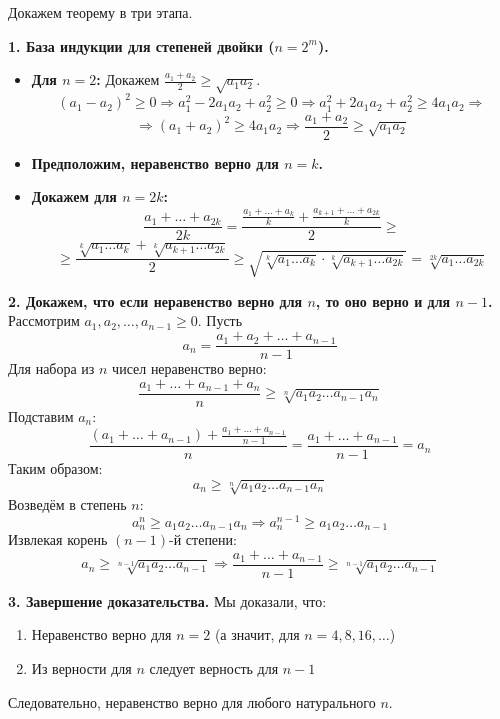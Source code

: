 \documentclass[12pt, a4paper]{article}
\begin{document}
\begin{centering}
\begin{tcolorbox}[title=Доказательство по ММИ (метод Коши / метод обратой индукции), breakable]
Докажем теорему в три этапа.

\textbf{1. База индукции для степеней двойки ($n=2^m$).}
\begin{itemize}
    \item \textbf{Для $n=2$:} Докажем $\frac{a_1 + a_2}{2} \geq \sqrt{a_1 a_2}$.
    $$(a_1 - a_2)^2 \geq 0 \Rightarrow a_1^2 - 2a_1a_2 + a_2^2 \geq 0 \Rightarrow a_1^2 + 2a_1a_2 + a_2^2 \geq 4a_1a_2 \Rightarrow$$
    $$\Rightarrow (a_1 + a_2)^2 \geq 4a_1a_2 \Rightarrow \frac{a_1 + a_2}{2} \geq \sqrt{a_1 a_2}$$
    \item \textbf{Предположим, неравенство верно для $n = k$.}
    \item \textbf{Докажем для $n = 2k$:}
    $$\frac{a_1 + \dots + a_{2k}}{2k} = \frac{\frac{a_1 + \dots + a_k}{k} + \frac{a_{k+1} + \dots + a_{2k}}{k}}{2} \geq$$
    $$\geq \frac{\sqrt[k]{a_1 \dots a_k} + \sqrt[k]{a_{k+1} \dots a_{2k}}}{2} \geq \sqrt{\sqrt[k]{a_1 \dots a_k} \cdot \sqrt[k]{a_{k+1} \dots a_{2k}}} = \sqrt[2k]{a_1 \dots a_{2k}}$$
\end{itemize}

\textbf{2. Докажем, что если неравенство верно для $n$, то оно верно и для $n-1$.}
Рассмотрим $a_1, a_2, \dots, a_{n-1} \geq 0$. Пусть
$$a_n = \frac{a_1 + a_2 + \dots + a_{n-1}}{n-1}$$
Для набора из $n$ чисел неравенство верно:
$$\frac{a_1 + \dots + a_{n-1} + a_n}{n} \geq \sqrt[n]{a_1 a_2 \dots a_{n-1} a_n}$$
Подставим $a_n$:
$$\frac{(a_1 + \dots + a_{n-1}) + \frac{a_1 + \dots + a_{n-1}}{n-1}}{n} = \frac{a_1 + \dots + a_{n-1}}{n-1} = a_n$$
Таким образом:
$$a_n \geq \sqrt[n]{a_1 a_2 \dots a_{n-1} a_n}$$
Возведём в степень $n$:
$$a_n^n \geq a_1 a_2 \dots a_{n-1} a_n \Rightarrow a_n^{n-1} \geq a_1 a_2 \dots a_{n-1}$$
Извлекая корень $(n-1)$-й степени:
$$a_n \geq \sqrt[n-1]{a_1 a_2 \dots a_{n-1}} \Rightarrow \frac{a_1 + \dots + a_{n-1}}{n-1} \geq \sqrt[n-1]{a_1 a_2 \dots a_{n-1}}$$

\textbf{3. Завершение доказательства.}
Мы доказали, что:
\begin{enumerate}
    \item Неравенство верно для $n=2$ (а значит, для $n=4,8,16,\dots$)
    \item Из верности для $n$ следует верность для $n-1$
\end{enumerate}
Следовательно, неравенство верно для любого натурального $n$.
\end{tcolorbox}


\end{centering}
\end{document}

